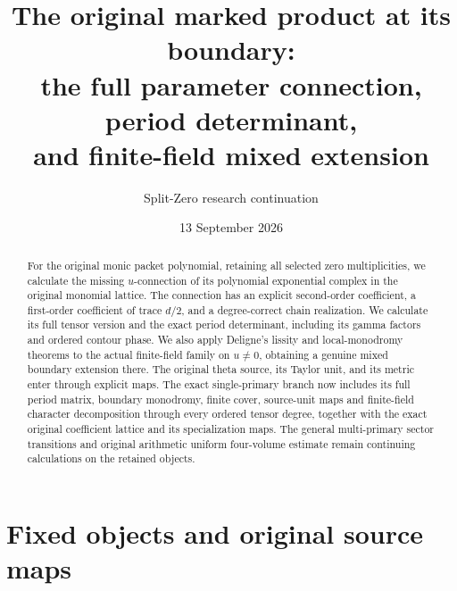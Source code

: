 \documentclass[11pt]{article}
\title{The original marked product at its boundary:\\
the full parameter connection, period determinant,\\
and finite-field mixed extension}
\author{Split-Zero research continuation}
\date{13 September 2026}
\begin{document}
\maketitle

\begin{abstract}
For the original monic packet polynomial, retaining all selected zero
multiplicities, we calculate the missing $u$-connection of its polynomial
exponential complex in the original monomial lattice.  The connection has
an explicit second-order coefficient, a first-order coefficient of trace
$d/2$, and a degree-correct chain realization.  We calculate its full
tensor version and the exact period determinant, including its gamma
factors and ordered contour phase.  We also apply Deligne's lissity and
local-monodromy theorems to the actual finite-field family on $u\ne0$,
obtaining a genuine mixed boundary extension there.  The original theta
source, its Taylor unit, and its metric enter through explicit maps.
The exact single-primary branch now includes its full period matrix,
boundary monodromy, finite cover, source-unit maps and finite-field
character decomposition through every ordered tensor degree, together
with the exact original coefficient lattice and its specialization maps. The general multi-primary sector transitions
and original arithmetic uniform four-volume estimate remain continuing
calculations on the retained objects.
\end{abstract}

\section{Fixed objects and original source maps}
\end{document}
